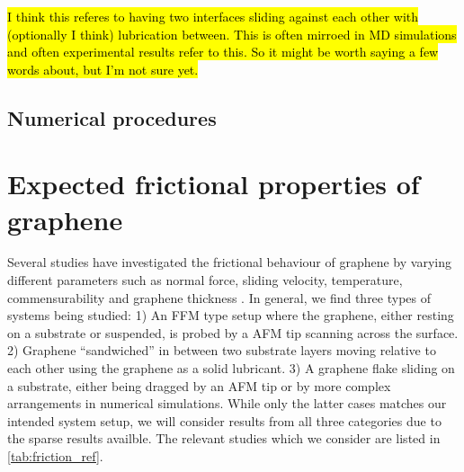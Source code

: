 \hl{I think this referes to having two interfaces sliding against each other with (optionally I think) lubrication between. This is often mirroed in MD simulations and often experimental results refer to this. So it might be worth saying a few words about, but I'm not sure yet.}
















\subsection{Numerical procedures}



\section{Expected frictional properties of graphene}\label{sec:expected_prop}

Several studies have investigated the frictional behaviour of graphene by varying different parameters such as normal force, sliding velocity, temperature, commensurability and graphene thickness \cite{penkov_tribology_2014}. In general, we find three types of systems being studied: 1) An \acrshort{FFM} type setup where the graphene, either resting on a substrate or suspended, is probed by a \acrshort{AFM} tip scanning across the surface. 2) Graphene ``sandwiched'' in between two substrate layers moving relative to each other using the graphene as a solid lubricant. 3) A graphene flake sliding on a substrate, either being dragged by an \acrshort{AFM} tip or by more complex arrangements in numerical simulations. While only the latter cases matches our intended system setup, we will consider results from all three categories due to the sparse results availble. The relevant studies which we consider are listed in \cref{tab:friction_ref}. 

